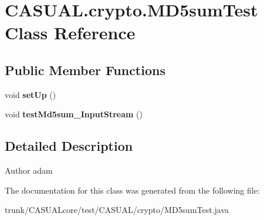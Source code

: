 \hypertarget{classCASUAL_1_1crypto_1_1MD5sumTest}{\section{C\-A\-S\-U\-A\-L.\-crypto.\-M\-D5sum\-Test Class Reference}
\label{classCASUAL_1_1crypto_1_1MD5sumTest}
}
\subsection*{Public Member Functions}
\begin{DoxyCompactItemize}
\item 
\hypertarget{classCASUAL_1_1crypto_1_1MD5sumTest_a03b77b8c2dbe1c4566d288d7b92c7d56}{void {\bfseries set\-Up} ()}\label{classCASUAL_1_1crypto_1_1MD5sumTest_a03b77b8c2dbe1c4566d288d7b92c7d56}

\item 
\hypertarget{classCASUAL_1_1crypto_1_1MD5sumTest_a90b541e86a5e7b31e8033e9e5a2a69a0}{void {\bfseries test\-Md5sum\-\_\-\-Input\-Stream} ()}\label{classCASUAL_1_1crypto_1_1MD5sumTest_a90b541e86a5e7b31e8033e9e5a2a69a0}

\end{DoxyCompactItemize}


\subsection{Detailed Description}
\begin{DoxyAuthor}{Author}
adam 
\end{DoxyAuthor}


The documentation for this class was generated from the following file\-:\begin{DoxyCompactItemize}
\item 
trunk/\-C\-A\-S\-U\-A\-Lcore/test/\-C\-A\-S\-U\-A\-L/crypto/M\-D5sum\-Test.\-java\end{DoxyCompactItemize}
